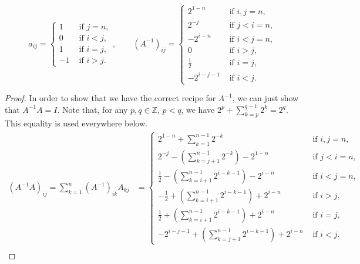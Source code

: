 \documentclass[11pt]{article}
\newcommand{\Z}{\mathbb{Z}}
\begin{document}
\begin{enumerate}
\begin{enumerate}
		            \[
			            a_{ij} = \begin{cases}
				            1  & \text{ if } j=n, \\
				            0  & \text{ if } i<j, \\
				            1  & \text{ if } i=j, \\
				            -1 & \text{ if } i>j.
			            \end{cases}, \quad\quad
			            (A^{-1})_{ij} = \begin{cases}
				            2^{1-n}    & \text{ if } i,j=n, \\
				            2^{-j}     & \text{ if } j<i=n, \\
				            -2^{i-n}   & \text{ if } i<j=n, \\
				            0          & \text{ if } i>j,   \\
				            \frac12    & \text{ if } i=j,   \\
				            -2^{i-j-1} & \text{ if } i<j.
			            \end{cases}
		            \]
		            \begin{proof}
			            In order to show that we have the correct recipe for \(A^{-1}\), we can just show that \(A^{-1}A = I\).
			            Note that, for any \(p,q \in \Z\), \(p < q\), we have \(2^p + \sum_{k=p}^{q-1} 2^k = 2^q\).  This equality is used everywhere below.
			            \begin{align*}
				            (A^{-1}A)_{ij} = \sum_{k=1}^n (A^{-1})_{ik}A_{kj}
				             & = \begin{cases}
					                 2^{1-n} + \sum_{k=1}^{n-1} 2^{-k}                               & \text{ if } i,j=n, \\
					                 2^{-j} - \left(\sum_{k=j+1}^{n-1} 2^{-k}\right) - 2^{1-n}       & \text{ if } j<i=n, \\
					                 \frac12 - \left(\sum_{k=i+1}^{n-1} 2^{i-k-1}\right) - 2^{i-n}   & \text{ if } i<j=n, \\
					                 -\frac12 + \left(\sum_{k=i+1}^{n-1} 2^{i-k-1}\right) + 2^{i-n}  & \text{ if } i>j,   \\
					                 \frac12 + \left(\sum_{k=i+1}^{n-1} 2^{i-k-1}\right) + 2^{i-n}   & \text{ if } i=j,   \\
					                 -2^{i-j-1} + \left(\sum_{k=j+1}^{n-1} 2^{i-k-1}\right) +2^{i-n} & \text{ if } i<j.
				                 \end{cases} \\

\end{align*}
\end{proof}
\end{enumerate}
\end{enumerate}
\end{document}
